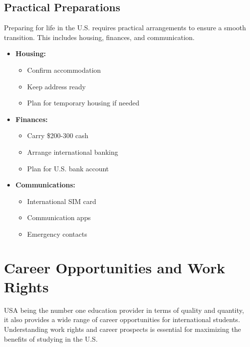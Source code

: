 \subsection{Practical Preparations}
Preparing for life in the U.S. requires practical arrangements to ensure a smooth transition. This includes housing, finances, and communication.
\begin{itemize}
    \item \textbf{Housing:}
    \begin{itemize}
        \item Confirm accommodation
        \item Keep address ready
        \item Plan for temporary housing if needed
    \end{itemize}
    
    \item \textbf{Finances:}
    \begin{itemize}
        \item Carry \$200-300 cash
        \item Arrange international banking
        \item Plan for U.S. bank account
    \end{itemize}
    
    \item \textbf{Communications:}
    \begin{itemize}
        \item International SIM card
        \item Communication apps
        \item Emergency contacts
    \end{itemize}
\end{itemize}

\section{Career Opportunities and Work Rights}
USA being the number one education provider in terms of quality and quantity, it also provides a wide range of career opportunities for international students. Understanding work rights and career prospects is essential for maximizing the benefits of studying in the U.S.
